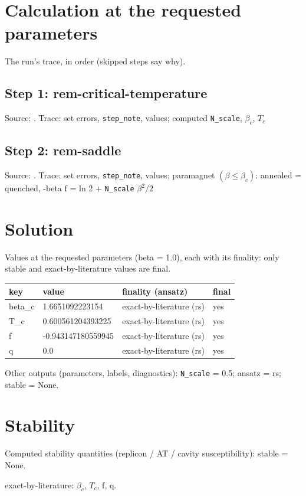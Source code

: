 \documentclass[11pt]{article}
\begin{document}
\section{Calculation at the requested parameters}
The run's trace, in order (skipped steps say why).
\subsection{Step 1: rem-critical-temperature}
Source: \cite{b1,b2}. Trace: set errors, \texttt{step\_note}, values; computed \texttt{N\_scale}, $\beta _{c}$, $T_{c}$

\subsection{Step 2: rem-saddle}
Source: \cite{b1,b2,b6}. Trace: set errors, \texttt{step\_note}, values; paramagnet $(\beta   \leq  \beta _{c})$: annealed = quenched, -beta f = ln 2 + \texttt{N\_scale} $\beta ^{2}/2$

\section{Solution}
Values at the requested parameters (beta = 1.0), each with its finality: only stable and exact-by-literature values are final.
\begin{center}
\begin{tabular}{llll}
key & value & finality (ansatz) & final \\
\hline
beta\_c & 1.6651092223154 & exact-by-literature (rs) \cite{b7,b2,b5} & yes \\
T\_c & 0.600561204393225 & exact-by-literature (rs) \cite{b7,b2,b5} & yes \\
f & -0.943147180559945 & exact-by-literature (rs) \cite{b7,b2,b5} & yes \\
q & 0.0 & exact-by-literature (rs) \cite{b7,b2,b5} & yes \\
\end{tabular}
\end{center}
Other outputs (parameters, labels, diagnostics): \texttt{N\_scale} = 0.5; ansatz = rs; stable = None.

\section{Stability}
Computed stability quantities (replicon / AT / cavity susceptibility): stable = None.

exact-by-literature: $\beta _{c}$, $T_{c}$, f, q.
\end{document}
